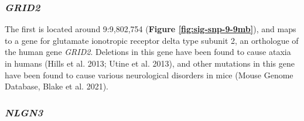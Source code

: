 \documentclass[
]{book}
\begin{document}
\begin{table}

\caption{\label{tab:tbl-sig-snp-chr-9-10}Top significant SNPs on chromosomes 9 and 10 for direct genetic effects on state 3 frequency during the novel object assay.}
\centering
{}
\end{table}

\hypertarget{grid2}{%
\subsubsection{\texorpdfstring{\emph{GRID2}}{GRID2}}\label{grid2}}

The first is located around 9:9,802,754 (\textbf{Figure \ref{fig:sig-snp-9-9mb}}), and maps to a gene for glutamate ionotropic receptor delta type subunit 2, an orthologue of the human gene \emph{GRID2}. Deletions in this gene have been found to cause ataxia in humans (Hills et al. 2013; Utine et al. 2013), and other mutations in this gene have been found to cause various neurological disorders in mice (Mouse Genome Database, Blake et al. 2021).

\hypertarget{nlgn3}{%
\subsubsection{\texorpdfstring{\emph{NLGN3}}{NLGN3}}\label{nlgn3}}
\end{document}
